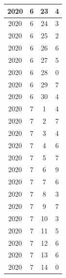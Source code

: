 \begin{longtable} {|c|c|c|c|}
\hline
2020         & 6            & 23           & 4                         \\ 
\hline
2020         & 6            & 24           & 3                         \\ 
\hline
2020         & 6            & 25           & 2                         \\ 
\hline
2020         & 6            & 26           & 6                         \\ 
\hline
2020         & 6            & 27           & 5                         \\ 
\hline
2020         & 6            & 28           & 0                         \\ 
\hline
2020         & 6            & 29           & 7                         \\ 
\hline
2020         & 6            & 30           & 4                         \\ 
\hline
2020         & 7            & 1            & 4                         \\ 
\hline
2020         & 7            & 2            & 7                         \\ 
\hline
2020         & 7            & 3            & 4                         \\ 
\hline
2020         & 7            & 4            & 6                         \\ 
\hline
2020         & 7            & 5            & 7                         \\ 
\hline
2020         & 7            & 6            & 9                         \\ 
\hline
2020         & 7            & 7            & 6                         \\ 
\hline
2020         & 7            & 8            & 3                         \\ 
\hline
2020         & 7            & 9            & 7                         \\ 
\hline
2020         & 7            & 10           & 3                         \\ 
\hline
2020         & 7            & 11           & 5                         \\ 
\hline
2020         & 7            & 12           & 6                         \\ 
\hline
2020         & 7            & 13           & 6                         \\ 
\hline
2020         & 7            & 14           & 0                         \\ 

\end{longtable}
